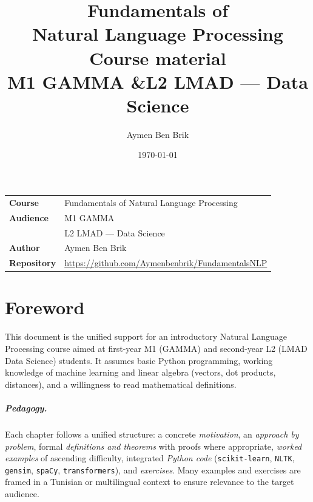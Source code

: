 \documentclass[12pt,a4paper,openright]{report}
\title{
    \vspace*{2cm}
    {\Huge \textbf{Fundamentals of}} \\[0.3cm]
    {\Huge \textbf{Natural Language Processing}} \\[1cm]
    {\Large Course material} \\[0.3cm]
    {\large M1 GAMMA \quad \&\quad L2 LMAD --- Data Science}
}
\author{Aymen Ben Brik}
\date{\today}
\theoremstyle{definition}
\theoremstyle{remark}
\begin{document}
\begin{titlepage}
\maketitle
\vfill
\begin{center}
\begin{tabular}{ll}
\textbf{Course} & Fundamentals of Natural Language Processing \\
\textbf{Audience} & M1 GAMMA \\
                  & L2 LMAD --- Data Science \\
\textbf{Author} & Aymen Ben Brik \\
\textbf{Repository} & \url{https://github.com/Aymenbenbrik/FundamentalsNLP} \\
\end{tabular}
\end{center}
\vfill
\end{titlepage}

\chapter*{Foreword}

This document is the unified support for an introductory Natural Language Processing course aimed at first-year M1 (GAMMA) and second-year L2 (LMAD Data Science) students. It assumes basic Python programming, working knowledge of machine learning and linear algebra (vectors, dot products, distances), and a willingness to read mathematical definitions.

\paragraph{Pedagogy.} Each chapter follows a unified structure: a concrete \emph{motivation}, an \emph{approach by problem}, formal \emph{definitions and theorems} with proofs where appropriate, \emph{worked examples} of ascending difficulty, integrated \emph{Python code} (\texttt{scikit-learn}, \texttt{NLTK}, \texttt{gensim}, \texttt{spaCy}, \texttt{transformers}), and \emph{exercises}. Many examples and exercises are framed in a Tunisian or multilingual context to ensure relevance to the target audience.
\end{document}
